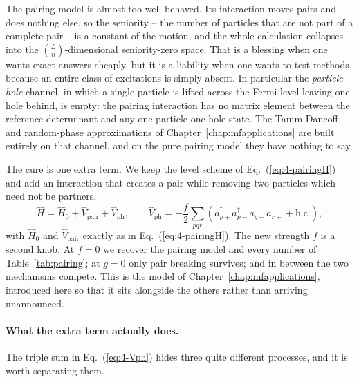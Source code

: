 The pairing model is almost too well behaved.  Its interaction moves pairs and
does nothing else, so the seniority -- the number of particles that are not
part of a complete pair -- is a constant of the motion, and the whole
calculation collapses into the $\binom{L}{n}$-dimensional seniority-zero space.
That is a blessing when one wants exact answers cheaply, but it is a
liability when one wants to test methods, because an entire class of
excitations is simply absent.  In particular the \emph{particle-hole} channel,
in which a single particle is lifted across the Fermi level leaving one hole
behind, is empty: the pairing interaction has no matrix element between the
reference determinant and any one-particle-one-hole state.  The
Tamm-Dancoff and random-phase approximations of
Chapter~\ref{chap:mfapplications} are built entirely on that channel, and on
the pure pairing model they have nothing to say.

The cure is one extra term.  We keep the level scheme of
Eq.~(\ref{eq:4-pairingH}) and add an interaction that creates a pair while
removing two particles which need not be partners,
\begin{equation}
  \hat{H} = \hat{H}_0 + \hat{V}_{\mathrm{pair}} + \hat{V}_{\mathrm{ph}},
  \qquad
  \hat{V}_{\mathrm{ph}} = -\frac{f}{2}\sum_{pqr}
    \left(a^{\dagger}_{p+}a^{\dagger}_{p-}a_{q-}a_{r+}
      + \mathrm{h.c.}\right),
  \label{eq:4-Vph}
\end{equation}
with $\hat{H}_0$ and $\hat{V}_{\mathrm{pair}}$ exactly as in
Eq.~(\ref{eq:4-pairingH}).  The new strength $f$ is a second knob.  At $f=0$
we recover the pairing model and every number of Table~\ref{tab:pairing}; at
$g=0$ only pair breaking survives; and in between the two mechanisms compete.
This is the model of Chapter~\ref{chap:mfapplications}, introduced here so
that it sits alongside the others rather than arriving unannounced.

\paragraph{What the extra term actually does.}
The triple sum in Eq.~(\ref{eq:4-Vph}) hides three quite different processes,
and it is worth separating them.

